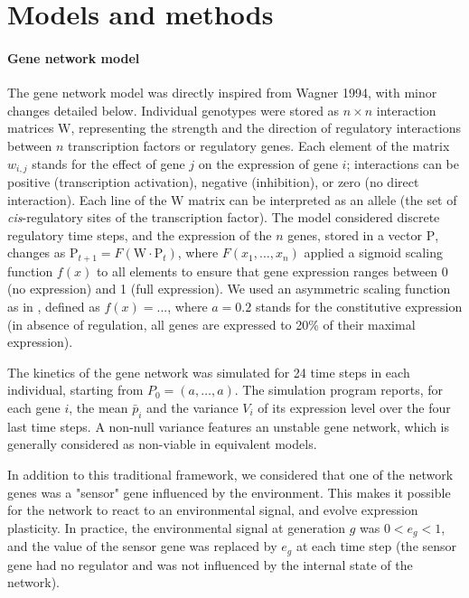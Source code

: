 \documentclass[12pt]{article}
\begin{document}
\section{Models and methods}
\paragraph{Gene network model}

The gene network model was directly inspired from Wagner 1994, with minor changes detailed below. Individual genotypes were stored as $n \times n$ interaction matrices $\bm{\mathrm W}$, representing the strength and the direction of regulatory interactions between $n$ transcription factors or regulatory genes. Each element of the matrix $w_{i,j}$ stands for the effect of gene $j$ on the expression of gene $i$; interactions can be positive (transcription activation), negative (inhibition), or zero (no direct interaction). Each line of the $\bm{\mathrm W}$ matrix can be interpreted as an allele (the set of \emph{cis}-regulatory sites of the transcription factor). The model considered discrete regulatory time steps, and the expression of the $n$ genes, stored in a vector $\bm{\mathrm P}$, changes as $\bm{\mathrm P}_{t+1} = F(\bm{\mathrm W} \cdot \bm{\mathrm P}_t)$, where $F(x_1, \dots, x_n)$ applied a sigmoid scaling function $f(x)$ to all elements to ensure that gene expression ranges between 0 (no expression) and 1 (full expression). We used an asymmetric scaling function as in \cite{RL16, ORL18}, defined as $f(x) = 
...$, where $a = 0.2$ stands for the constitutive expression (in absence of regulation, all genes are expressed to 20\% of their maximal expression). 

The kinetics of the gene network was simulated for 24 time steps in each individual, starting from $P_0 = (a, \dots, a)$. The simulation program reports, for each gene $i$, the mean $\bar p_i$ and the variance $V_i$ of its expression level over the four last time steps. A non-null variance features an unstable gene network, which is generally considered as non-viable in equivalent models. 

In addition to this traditional framework, we considered that one of the network genes was a "sensor" gene influenced by the environment. This makes it possible for the network to react to an environmental signal, and evolve expression plasticity. In practice, the environmental signal at generation $g$ was $0 < e_g < 1$, and the value of the sensor gene was replaced by $e_g$ at each time step (the sensor gene had no regulator and was not influenced by the internal state of the network).  
\end{document}
